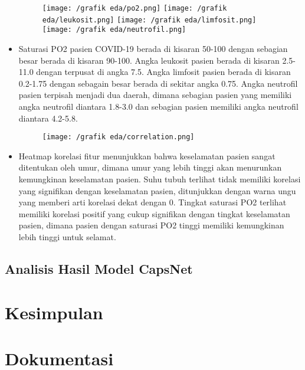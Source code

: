 \documentclass{article}
\begin{document}
\begin{itemize}
		\begin{figure}[H]
			\centering
			\texttt{[image: /grafik eda/po2.png]}
			\texttt{[image: /grafik eda/leukosit.png]}
			\texttt{[image: /grafik eda/limfosit.png]}
			\texttt{[image: /grafik eda/neutrofil.png]}
		\end{figure}
		\item Saturasi PO2 pasien COVID-19 berada di kisaran 50-100 dengan sebagian besar berada di kisaran 90-100. Angka leukosit pasien berada di kisaran 2.5-11.0 dengan terpusat di angka 7.5. Angka limfosit pasien berada di kisaran 0.2-1.75 dengan sebagain besar berada di sekitar angka 0.75. Angka neutrofil pasien terpisah menjadi dua daerah, dimana sebagian pasien yang memiliki angka neutrofil diantara 1.8-3.0 dan sebagian pasien memiliki angka neutrofil diantara 4.2-5.8.
		
		\begin{figure}[H]
			\centering
			\texttt{[image: /grafik eda/correlation.png]}
		\end{figure}
		\item Heatmap korelasi fitur menunjukkan bahwa keselamatan pasien sangat ditentukan oleh umur, dimana umur yang lebih tinggi akan menurunkan kemungkinan keselamatan pasien. Suhu tubuh terlihat tidak memiliki korelasi yang signifikan dengan keselamatan pasien, ditunjukkan dengan warna ungu yang memberi arti korelasi dekat dengan 0. Tingkat saturasi PO2 terlihat memiliki korelasi positif yang cukup signifikan dengan tingkat keselamatan pasien, dimana pasien dengan saturasi PO2 tinggi memiliki kemungkinan lebih tinggi untuk selamat. 
    	
     \end{itemize}
   	\subsection{Analisis Hasil Model CapsNet}
   \section{Kesimpulan}
   \section{Dokumentasi}
   \printbibliography[title=Daftar Pustaka]
\end{document}
